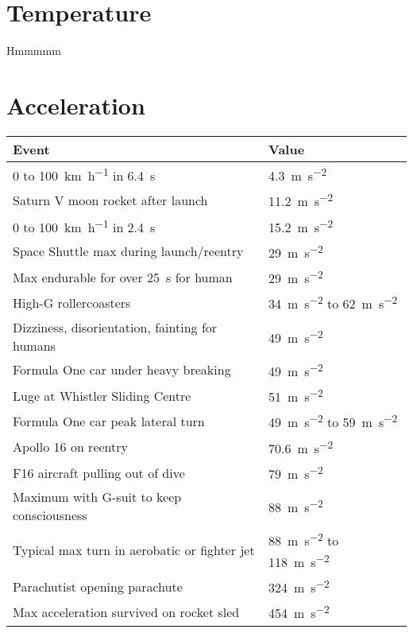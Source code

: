 \documentclass{article}
\begin{document}
\section{Temperature}
Hmmmmm

\section{Acceleration}
\begin{table}[H]
	\centering
	\begin{tabularx}{\textwidth}{ X X }
		Event & Value \\
		\hline
		0 to \SI{100}{\kilo\meter\per\hour} in \SI{6.4}{\second} & \SI{4.3}{\meter\per\square\second} \\
		Saturn V moon rocket after launch & \SI{11.2}{\meter\per\square\second} \\
		0 to \SI{100}{\kilo\meter\per\hour} in \SI{2.4}{\second} & \SI{15.2}{\meter\per\square\second} \\
		Space Shuttle max during launch/reentry & \SI{29}{\meter\per\square\second} \\
		Max endurable for over \SI{25}{\second} for human & \SI{29}{\meter\per\square\second} \\
		High-G rollercoasters & \SI{34}{\meter\per\square\second} to \SI{62}{\meter\per\square\second} \\
		Dizziness, disorientation, fainting for humans & \SI{49}{\meter\per\square\second} \\
		Formula One car under heavy breaking & \SI{49}{\meter\per\square\second} \\
		Luge at Whistler Sliding Centre & \SI{51}{\meter\per\square\second} \\
		Formula One car peak lateral turn & \SI{49}{\meter\per\square\second} to \SI{59}{\meter\per\square\second} \\
		Apollo 16 on reentry & \SI{70.6}{\meter\per\square\second} \\
		F16 aircraft pulling out of dive & \SI{79}{\meter\per\square\second} \\
		Maximum with G-suit to keep consciousness & \SI{88}{\meter\per\square\second} \\
		Typical max turn in aerobatic or fighter jet & \SI{88}{\meter\per\square\second} to \SI{118}{\meter\per\square\second} \\
		Parachutist opening parachute & \SI{324}{\meter\per\square\second} \\
		Max acceleration survived on rocket sled & \SI{454}{\meter\per\square\second} \\

\end{tabularx}
\end{table}
\end{document}
